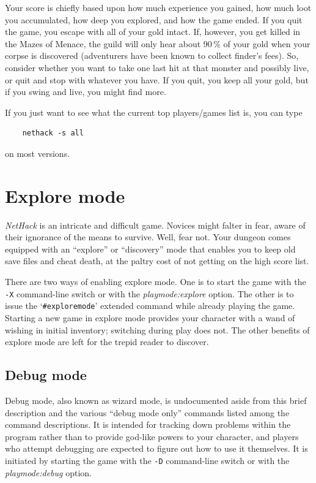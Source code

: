 \documentclass[titlepage]{article}
\begin{document}
Your score is chiefly based upon how much experience you gained, how
much loot you accumulated, how deep you explored, and how the game
ended.  If you quit the game, you escape with all of your gold intact.
If, however, you get killed in the Mazes of Menace, the guild will
only hear about 90\,\% of your gold when your corpse is discovered
(adventurers have been known to collect finder's fees).  So, consider
whether you want to take one last hit at that monster and possibly
live, or quit and stop with whatever you have.  If you quit, you keep
all your gold, but if you swing and live, you might find more.

If you just want to see what the current top players/games list is, you
can type
\begin{verbatim}
    nethack -s all
\end{verbatim}
on most versions.

\section{Explore mode}

\textit{NetHack} is an intricate and difficult game.  Novices might falter
in fear, aware of their ignorance of the means to survive.  Well, fear
not.  Your dungeon comes equipped with an ``explore'' or ``discovery''
mode that enables you to keep old save files and cheat death, at the
paltry cost of not getting on the high score list.

There are two ways of enabling explore mode.  One is to start the game
with the \texttt{-X}
command-line switch or with the
\textit{playmode:explore}
option.  The other is to issue the `\texttt{\#exploremode}' extended command while
already playing the game.  Starting a new game in explore mode provides your
character with a wand of wishing in initial inventory; switching
during play does not.  The other benefits of explore mode are left for
the trepid reader to discover.

\subsection*{Debug mode}

Debug mode, also known as wizard mode, is undocumented aside from this
brief description and the various ``debug mode only'' commands listed
among the command descriptions.
It is intended for tracking down problems within the
program rather than to provide god-like powers to your character, and
players who attempt debugging are expected to figure out how to use it
themselves.
It is initiated by starting the game with the
\texttt{-D}
command-line switch or with the
\textit{playmode:debug}
option.
\end{document}
